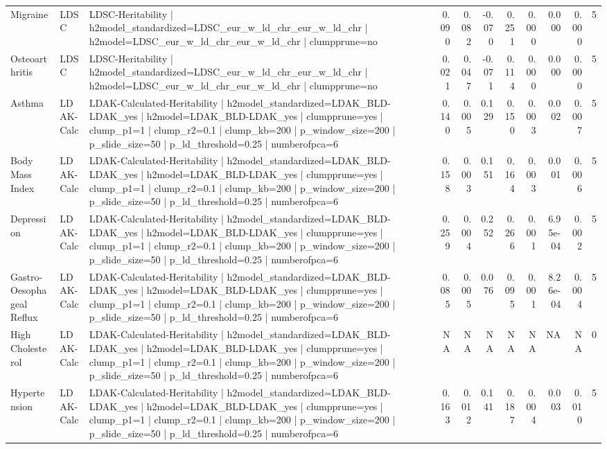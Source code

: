 \begin{landscape}
\begin{longtable}{p{2.4cm}p{1.8cm}p{6.0cm}rrrrrrrr}
Migraine & LDSC & LDSC-Heritability | h2model\_standardized=LDSC\_eur\_w\_ld\_chr\_eur\_w\_ld\_chr | h2model=LDSC\_eur\_w\_ld\_chr\_eur\_w\_ld\_chr | clumpprune=no & 0.090 & 0.082 & -0.070 & 0.251 & 0.000 & 0.000 & 0.000 & 5 \\
Osteoarthritis & LDSC & LDSC-Heritability | h2model\_standardized=LDSC\_eur\_w\_ld\_chr\_eur\_w\_ld\_chr | h2model=LDSC\_eur\_w\_ld\_chr\_eur\_w\_ld\_chr | clumpprune=no & 0.021 & 0.047 & -0.071 & 0.114 & 0.000 & 0.000 & 0.000 & 5 \\
Asthma & LDAK-Calc & LDAK-Calculated-Heritability | h2model\_standardized=LDAK\_BLD-LDAK\_yes | h2model=LDAK\_BLD-LDAK\_yes | clumpprune=yes | clump\_p1=1 | clump\_r2=0.1 | clump\_kb=200 | p\_window\_size=200 | p\_slide\_size=50 | p\_ld\_threshold=0.25 | numberofpca=6 & 0.140 & 0.005 & 0.129 & 0.150 & 0.003 & 0.002 & 0.007 & 5 \\
Body Mass Index & LDAK-Calc & LDAK-Calculated-Heritability | h2model\_standardized=LDAK\_BLD-LDAK\_yes | h2model=LDAK\_BLD-LDAK\_yes | clumpprune=yes | clump\_p1=1 | clump\_r2=0.1 | clump\_kb=200 | p\_window\_size=200 | p\_slide\_size=50 | p\_ld\_threshold=0.25 | numberofpca=6 & 0.158 & 0.003 & 0.151 & 0.164 & 0.003 & 0.001 & 0.006 & 5 \\
Depression & LDAK-Calc & LDAK-Calculated-Heritability | h2model\_standardized=LDAK\_BLD-LDAK\_yes | h2model=LDAK\_BLD-LDAK\_yes | clumpprune=yes | clump\_p1=1 | clump\_r2=0.1 | clump\_kb=200 | p\_window\_size=200 | p\_slide\_size=50 | p\_ld\_threshold=0.25 | numberofpca=6 & 0.259 & 0.004 & 0.252 & 0.266 & 0.001 & 6.95e-04 & 0.002 & 5 \\
Gastro-Oesophageal Reflux & LDAK-Calc & LDAK-Calculated-Heritability | h2model\_standardized=LDAK\_BLD-LDAK\_yes | h2model=LDAK\_BLD-LDAK\_yes | clumpprune=yes | clump\_p1=1 | clump\_r2=0.1 | clump\_kb=200 | p\_window\_size=200 | p\_slide\_size=50 | p\_ld\_threshold=0.25 | numberofpca=6 & 0.085 & 0.005 & 0.076 & 0.095 & 0.001 & 8.26e-04 & 0.004 & 5 \\
High Cholesterol & LDAK-Calc & LDAK-Calculated-Heritability | h2model\_standardized=LDAK\_BLD-LDAK\_yes | h2model=LDAK\_BLD-LDAK\_yes | clumpprune=yes | clump\_p1=1 | clump\_r2=0.1 | clump\_kb=200 | p\_window\_size=200 | p\_slide\_size=50 | p\_ld\_threshold=0.25 | numberofpca=6 & NA & NA & NA & NA & NA & NA & NA & 0 \\
Hypertension & LDAK-Calc & LDAK-Calculated-Heritability | h2model\_standardized=LDAK\_BLD-LDAK\_yes | h2model=LDAK\_BLD-LDAK\_yes | clumpprune=yes | clump\_p1=1 | clump\_r2=0.1 | clump\_kb=200 | p\_window\_size=200 | p\_slide\_size=50 | p\_ld\_threshold=0.25 | numberofpca=6 & 0.163 & 0.012 & 0.141 & 0.187 & 0.004 & 0.003 & 0.010 & 5 \\

\end{longtable}
\end{landscape}
